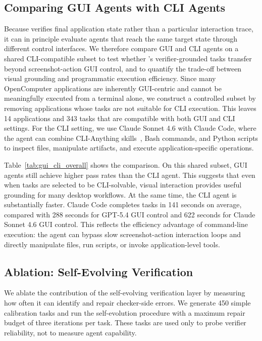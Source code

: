 


\subsection{Comparing GUI Agents with CLI Agents}
Because \ours verifies final application state rather than a particular interaction trace, it can in principle evaluate agents that reach the same target state through different control interfaces. We therefore compare GUI and CLI agents on a shared CLI-compatible subset to test whether \ours’s verifier-grounded tasks transfer beyond screenshot-action GUI control, and to quantify the trade-off between visual grounding and programmatic execution efficiency.
Since many OpenComputer applications are inherently GUI-centric and cannot be meaningfully executed from a terminal alone, we
construct a controlled subset by removing applications whose tasks are not
suitable for CLI execution. This leaves 14 applications and 343 tasks that are
compatible with both GUI and CLI settings. For the CLI setting, we use Claude
Sonnet 4.6 with Claude Code, where the agent can combine CLI-Anything skills~\citep{hkuds2026clianything},
Bash commands, and Python scripts to inspect files, manipulate artifacts, and
execute application-specific operations.


Table~\ref{tab:gui_cli_overall} shows the comparison. On this shared subset,
GUI agents still achieve higher pass rates than the CLI agent. This suggests that even when tasks are selected to be CLI-solvable, visual interaction provides useful grounding for many desktop workflows. At the same time, the CLI agent is substantially faster. Claude Code completes
tasks in 141 seconds on average, compared with 288 seconds for GPT-5.4 GUI
control and 622 seconds for Claude Sonnet 4.6 GUI control. This reflects the efficiency advantage of command-line
execution: the agent can bypass slow screenshot-action interaction loops and directly manipulate files, run scripts, or invoke application-level tools.
\subsection{Ablation: Self-Evolving Verification}

We ablate the contribution of the self-evolving verification layer by measuring how often it can
identify and repair checker-side errors. We generate 450 simple calibration tasks and run the
self-evolution procedure with a maximum repair budget of three iterations per task. These tasks are
used only to probe verifier reliability, not to measure agent capability.


